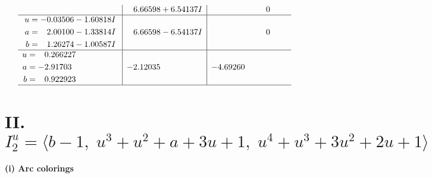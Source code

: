\documentclass[1p]{elsarticle_modified}
\theoremstyle{definition}
\begin{document}
$$\begin{array}{c|c|c}
 & \phantom{-}6.66598 + 6.54137 I & \phantom{-0.000000 } 0 \\ \hline\begin{aligned}
u &= -0.03506 - 1.60818 I \\
a &= \phantom{-}2.00100 - 1.33814 I \\
b &= \phantom{-}1.26274 - 1.00587 I\end{aligned}
 & \phantom{-}6.66598 - 6.54137 I & \phantom{-0.000000 } 0 \\ \hline\begin{aligned}
u &= \phantom{-}0.266227\phantom{ +0.000000I} \\
a &= -2.91703\phantom{ +0.000000I} \\
b &= \phantom{-}0.922923\phantom{ +0.000000I}\end{aligned}
 & -2.12035\phantom{ +0.000000I} & -4.69260\phantom{ +0.000000I}\\
 \hline 
 \end{array}$$\newpage\newpage\renewcommand{\arraystretch}{1}
\centering \section*{II. $I^u_{2}= \langle b-1,\;u^3+u^2+a+3 u+1,\;u^4+u^3+3 u^2+2 u+1 \rangle$}
\flushleft \textbf{(i) Arc colorings}\\
\end{document}

